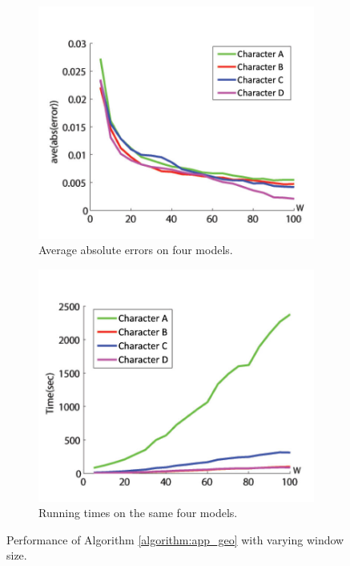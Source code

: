 \begin{figure}[H]
        \centering
        \begin{subfigure}[b]{0.5\textwidth}
                \includegraphics[width=\textwidth]{../images/geodesic_image/absolute_error}
                \caption{Average absolute errors on four models.}
                \label{figure:window_error}
        \end{subfigure}%
        \begin{subfigure}[b]{0.5\textwidth}
                \includegraphics[width=\textwidth]{../images/geodesic_image/running_time}
                \caption{Running times on the same four models.}
                \label{figure:window_time}
        \end{subfigure}
        \caption{Performance of Algorithm \ref{algorithm:app_geo} with varying window size.}\label{figure:vary_window}
\end{figure}

